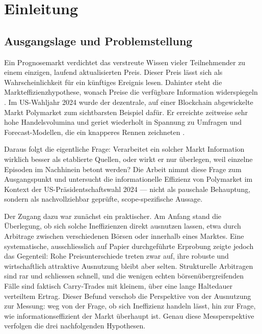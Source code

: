 \chapter{Einleitung}
\label{ch:intro}

\section{Ausgangslage und Problemstellung}
Ein Prognosemarkt verdichtet das verstreute Wissen vieler Teilnehmender zu einem
einzigen, laufend aktualisierten Preis. Dieser Preis lässt sich als
Wahrscheinlichkeit für ein künftiges Ereignis lesen. Dahinter steht die
Markteffizienzhypothese, wonach Preise die verfügbare Information widerspiegeln
\citep{lit_emh_001}. Im US-Wahljahr 2024 wurde der dezentrale, auf einer Blockchain
abgewickelte Markt Polymarket zum sichtbarsten Beispiel dafür. Er erreichte
zeitweise sehr hohe Handelsvolumina und geriet wiederholt in Spannung zu Umfragen
und Forecast-Modellen, die ein knapperes Rennen zeichneten
\citep{zotero_poly_001,zotero_poly_009}.

Daraus folgt die eigentliche Frage: Verarbeitet ein solcher Markt Information
wirklich besser als etablierte Quellen, oder wirkt er nur überlegen, weil einzelne
Episoden im Nachhinein betont werden? Die Arbeit nimmt diese Frage zum Ausgangspunkt
und untersucht die informationelle Effizienz von Polymarket im Kontext der
US-Präsidentschaftswahl 2024 --- nicht als pauschale Behauptung, sondern als
nachvollziehbar geprüfte, scope-spezifische Aussage.

Der Zugang dazu war zunächst ein praktischer. Am Anfang stand die Überlegung, ob
sich solche Ineffizienzen direkt ausnutzen lassen, etwa durch Arbitrage zwischen
verschiedenen Börsen oder innerhalb eines Marktes. Eine systematische, ausschliesslich
auf Papier durchgeführte Erprobung zeigte jedoch das Gegenteil: Rohe
Preisunterschiede treten zwar auf, ihre robuste und wirtschaftlich attraktive
Ausnutzung bleibt aber selten. Strukturelle Arbitragen sind rar und schliessen
schnell, und die wenigen echten börsenübergreifenden Fälle sind faktisch
Carry-Trades mit kleinem, über eine lange Haltedauer verteiltem Ertrag. Dieser
Befund verschob die Perspektive von der Ausnutzung zur Messung: weg von der Frage,
ob sich Ineffizienz handeln lässt, hin zur Frage, wie informationseffizient der
Markt überhaupt ist. Genau diese Messperspektive verfolgen die drei nachfolgenden
Hypothesen.

